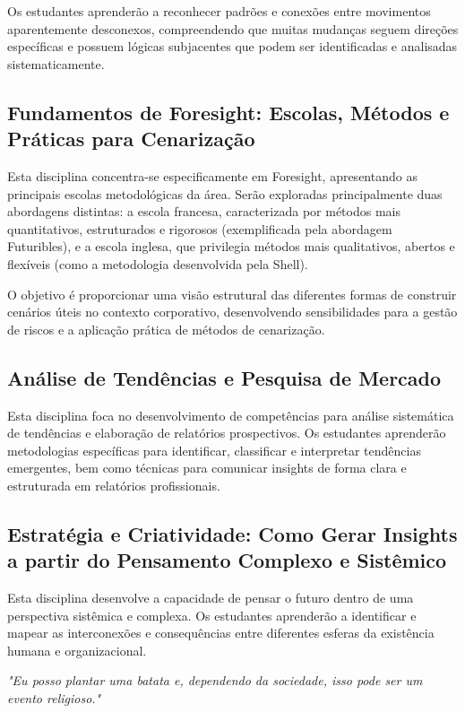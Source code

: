 Os estudantes aprenderão a reconhecer padrões e conexões entre movimentos aparentemente desconexos, compreendendo que muitas mudanças seguem direções específicas e possuem lógicas subjacentes que podem ser identificadas e analisadas sistematicamente.

\subsection{Fundamentos de Foresight: Escolas, Métodos e Práticas para Cenarização}

Esta disciplina concentra-se especificamente em Foresight, apresentando as principais escolas metodológicas da área. Serão exploradas principalmente duas abordagens distintas: a escola francesa, caracterizada por métodos mais quantitativos, estruturados e rigorosos (exemplificada pela abordagem Futuribles), e a escola inglesa, que privilegia métodos mais qualitativos, abertos e flexíveis (como a metodologia desenvolvida pela Shell).

O objetivo é proporcionar uma visão estrutural das diferentes formas de construir cenários úteis no contexto corporativo, desenvolvendo sensibilidades para a gestão de riscos e a aplicação prática de métodos de cenarização.

\subsection{Análise de Tendências e Pesquisa de Mercado}

Esta disciplina foca no desenvolvimento de competências para análise sistemática de tendências e elaboração de relatórios prospectivos. Os estudantes aprenderão metodologias específicas para identificar, classificar e interpretar tendências emergentes, bem como técnicas para comunicar insights de forma clara e estruturada em relatórios profissionais.

\subsection{Estratégia e Criatividade: Como Gerar Insights a partir do Pensamento Complexo e Sistêmico}

Esta disciplina desenvolve a capacidade de pensar o futuro dentro de uma perspectiva sistêmica e complexa. Os estudantes aprenderão a identificar e mapear as interconexões e consequências entre diferentes esferas da existência humana e organizacional.

\begin{thinkerquote}
\textit{"Eu posso plantar uma batata e, dependendo da sociedade, isso pode ser um evento religioso."}
\end{thinkerquote}


